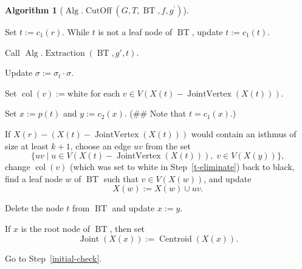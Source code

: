 \documentclass[letter,11pt]{article}
\theoremstyle{definition}
\theoremstyle{definition}
\newtheorem{alg}{Algorithm}
\DeclareMathOperator{\BT}{BT}
\DeclareMathOperator{\col}{col}
\DeclareMathOperator{\Alg}{Alg}
\DeclareMathOperator{\Cen}{Centroid}
\DeclareMathOperator{\Joi}{Joint}
\DeclareMathOperator{\JoiV}{JointVertex}
\DeclareMathOperator{\PacCon}{PackedConfig}
\DeclareMathOperator{\CutOff}{CutOff}
\DeclareMathOperator{\Extraction}{Extraction}
\newcommand{\1}{\boldmath$~1~$\unboldmath}
\newcommand{\tume}{\hspace*{0.2em}}
\newcommand{\maru}[1]{{\ooalign{\hfill$\small#1$\hfill\crcr\scalebox{1.3}{$\bigcirc$}}}}
\newenvironment{alg-enumerate}{%
  \begin{enumerate}%
   \renewcommand{\theenumi}{\arabic{enumi}}%
   \renewcommand{\labelenumi}{\rm{{\maru{\theenumi}}\tume\/}}%
   \renewcommand{\labelenumii}{\rm{$(${\maru{\theenumi}}-\theenumii$)$\tume\/}}%
 }{\end{enumerate}%
}
\newcommand{\namelistlabel}[1]{\hspace*{10pt}\mbox{#1}:\hspace{\fill}}
\newenvironment{namelist}[1]{%
    \begin{list}{}
      {\let\makelabel\namelistlabel
      \settowidth{\labelwidth}{#1}
      \setlength{\leftmargin}{1.1\labelwidth}
      \setlength{\labelsep}{5pt}
      \setlength{\parsep}{0pt}}
  }{%
  \end{list}}
\begin{document}
\begin{alg}[$\Alg.\CutOff(G,T,\BT,f,g^{\prime})$]
\begin{alg-enumerate}
\item
Set $t:=c_1(r)$.  
While $t$ is not a leaf node of $\BT$, update $t:=c_1(t)$.

\item
Call $\Alg.\Extraction(\BT,g',t)$.

\item
Update $\sigma := \sigma_t\cdot\sigma$.

\item
Set $\col(v):=\mathrm{white}$ for each 
$v\in V(X(t)-\JoiV(X(t)))$.  
\label{t-eliminate}

\item
Set $x:=p(t)$ and $y:=c_2(x)$.  
(\#\# Note that $t=c_1(x)$.)

\item
If $X(r)-(X(t)-\JoiV(X(t)))$ would contain an isthmus of size at least $k+1$,  
choose an edge $uv$ from the set
\[
\{uv\mid u\in V(X(t)-\JoiV(X(t))),\; v\in V(X(y))\},
\]
change $\col(v)$ (which was set to white in Step~\ref{t-eliminate}) back to black,  
find a leaf node $w$ of $\BT$ such that $v\in V(X(w))$, and update
\[
X(w):=X(w)\cup uv .
\]
\label{hige}

\item
Delete the node $t$ from $\BT$ and update $x:=y$.  
\label{del-t}

\item
If $x$ is the root node of $\BT$, then set
\[
\Joi(X(x)) := \Cen(X(x)).
\]

\item
Go to Step~\ref{initial-check}.

\end{alg-enumerate}
\end{alg}
\end{document}
